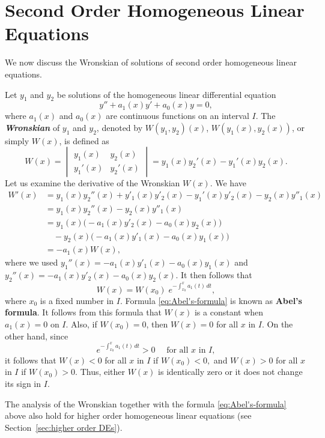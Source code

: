 \section{Second Order Homogeneous Linear Equations}\label{sec:second-higher-order equations}
 We now discuss the Wronskian of solutions of second order homogeneous  linear  equations.   
 
 Let \( y_1 \) and \( y_2 \) be solutions of the  homogeneous linear  differential equation  
 \[
 y'' + a_1(x)y' + a_0(x)y = 0,
 \]
 where \( a_1(x) \) and \( a_0(x) \) are continuous functions on an interval $I.$  
 The \textbf{\textit{Wronskian}} of \( y_1 \) and \( y_2 \), denoted by \( W(y_1, y_2)(x) \), \( W(y_1(x), y_2(x)) \), or simply \( W(x) \), is defined as  
 \[
 W(x) =
 \begin{vmatrix}
 	y_1(x) & y_2(x) \\
 	y_1'(x) & y_2'(x)
 \end{vmatrix}
 = y_1(x)y_2'(x) - y_1'(x)y_2(x).
 \]
Let us examine the derivative of the Wronskian $W(x).$  We have
\[
\begin{split}
	W'(x) &= y_1(x)y_2''(x)+y'_1(x)y'_2(x) - y_1'(x)y'_2(x)- y_2(x)y''_1(x)\\
	&=y_1(x)y_2''(x)-y_2(x)y''_1(x)\\
	&=y_1(x)\big(-a_1(x) y'_2(x)- a_0(x)y_2(x)\big)\\
	&\quad -y_2(x)\big(-a_1(x) y'_1(x)- a_0(x)y_1(x)\big)\\
	&=- a_1(x) W(x),
\end{split}\]
where we used \(y_1''(x) = -a_1(x) y'_1(x)- a_0(x)y_1(x)\) and \(y_2''(x) = -a_1(x) y'_2(x)- a_0(x)y_2(x).\)
It then follows that 
\begin{equation}\label{eq:Abel's-formula}
	W(x) =W(x_0)\; e^{-\int_{x_0}^x a_1(t)\, dt},
\end{equation}  where $x_0$ is a fixed number in $I.$ 
Formula \eqref{eq:Abel's-formula} is known as \textbf{Abel's formula}. It follows from this formula that \(W(x)\) is a constant  when $a_1(x) =0$  on $I.$ Also, if $W(x_0)= 0$, then $W(x) = 0$ for all $x$ in $I.$ On the other hand,  since \[e^{-\int_{x_0}^x a_1(t)\, dt} >0 \quad \mbox{ for all } x \mbox{ in } I,\]  it follows that $W(x) <0$ for all $x$ in $I$ if $W(x_0)<0,$ and $W(x) >0$ for all $x$ in $I$ if $W(x_0)>0.$   Thus, either $W(x)$ is  identically zero or it does not change its sign in $I.$

The  analysis  of the Wronskian together with the formula \eqref{eq:Abel's-formula} above also hold for higher order homogeneous linear equations (see Section~\ref{sec:higher order DEs}). 



